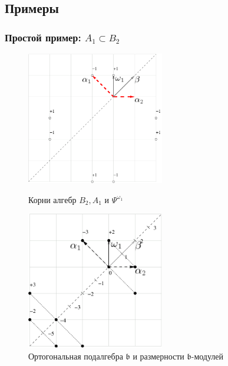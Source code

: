 \documentclass[pdftex]{beamer}
\theoremstyle{definition} \newtheorem{Def}{Определение}
\begin{document}
\subsection{Примеры}
\begin{frame}
  \frametitle{Простой пример: $A_{1}\subset B_{2}$}
  \begin{figure}[t]
    \vspace*{-0.5cm}
    \begin{multicols}{2}
      \hfill
      \includegraphics[width=60mm]{figures/figure1}
      \hfill
      \caption{Корни алгебр $B_{2},A_{1}$ и $\Psi ^{\omega_1  }$}
      \hfill
      \vspace{5mm}
      \includegraphics[width=60mm]{figures/figure2}
      \caption{Ортогональная подалгебра $\mathfrak{b}$ и размерности $\mathfrak{b}$-модулей}
    \end{multicols}
  \end{figure}
\end{frame}
\end{document}
